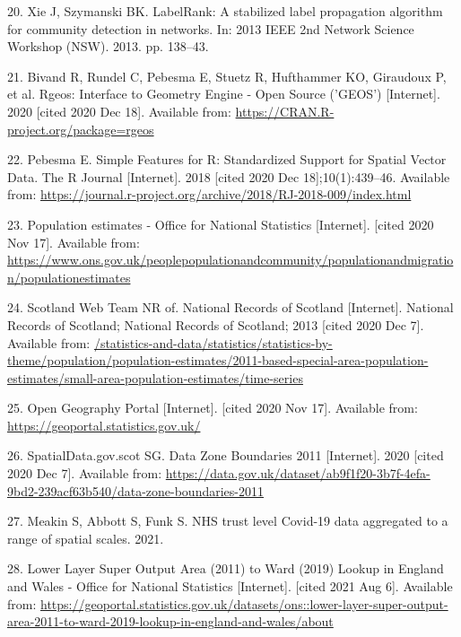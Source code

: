 \documentclass[
]{article}
\begin{document}
\leavevmode\hypertarget{ref-xieLabelRankStabilizedLabel2013}{}%
20. Xie J, Szymanski BK. LabelRank: A stabilized label propagation
algorithm for community detection in networks. In: 2013 IEEE 2nd Network
Science Workshop (NSW). 2013. pp. 138--43.

\leavevmode\hypertarget{ref-bivandRgeosInterfaceGeometry2020}{}%
21. Bivand R, Rundel C, Pebesma E, Stuetz R, Hufthammer KO, Giraudoux P,
et al. Rgeos: Interface to Geometry Engine - Open Source ('GEOS')
{[}Internet{]}. 2020 {[}cited 2020 Dec 18{]}. Available from:
\url{https://CRAN.R-project.org/package=rgeos}

\leavevmode\hypertarget{ref-pebesmaSimpleFeaturesStandardized2018}{}%
22. Pebesma E. Simple Features for R: Standardized Support for Spatial
Vector Data. The R Journal {[}Internet{]}. 2018 {[}cited 2020 Dec
18{]};10(1):439--46. Available from:
\url{https://journal.r-project.org/archive/2018/RJ-2018-009/index.html}

\leavevmode\hypertarget{ref-PopulationEstimatesOffice}{}%
23. Population estimates - Office for National Statistics
{[}Internet{]}. {[}cited 2020 Nov 17{]}. Available from:
\url{https://www.ons.gov.uk/peoplepopulationandcommunity/populationandmigration/populationestimates}

\leavevmode\hypertarget{ref-teamNationalRecordsScotland2013}{}%
24. Scotland Web Team NR of. National Records of Scotland
{[}Internet{]}. National Records of Scotland; National Records of
Scotland; 2013 {[}cited 2020 Dec 7{]}. Available from:
\url{/statistics-and-data/statistics/statistics-by-theme/population/population-estimates/2011-based-special-area-population-estimates/small-area-population-estimates/time-series}

\leavevmode\hypertarget{ref-OpenGeographyPortal}{}%
25. Open Geography Portal {[}Internet{]}. {[}cited 2020 Nov 17{]}.
Available from: \url{https://geoportal.statistics.gov.uk/}

\leavevmode\hypertarget{ref-spatialdata.gov.scotDataZoneBoundaries2020}{}%
26. SpatialData.gov.scot SG. Data Zone Boundaries 2011 {[}Internet{]}.
2020 {[}cited 2020 Dec 7{]}. Available from:
\url{https://data.gov.uk/dataset/ab9f1f20-3b7f-4efa-9bd2-239acf63b540/data-zone-boundaries-2011}

\leavevmode\hypertarget{ref-meakinNHSTrustLevel2021}{}%
27. Meakin S, Abbott S, Funk S. NHS trust level Covid-19 data aggregated
to a range of spatial scales. 2021.

\leavevmode\hypertarget{ref-officeofnationalstatisticsLowerLayerSuper}{}%
28. Lower Layer Super Output Area (2011) to Ward (2019) Lookup in
England and Wales - Office for National Statistics {[}Internet{]}.
{[}cited 2021 Aug 6{]}. Available from:
\url{https://geoportal.statistics.gov.uk/datasets/ons::lower-layer-super-output-area-2011-to-ward-2019-lookup-in-england-and-wales/about}
\end{document}
